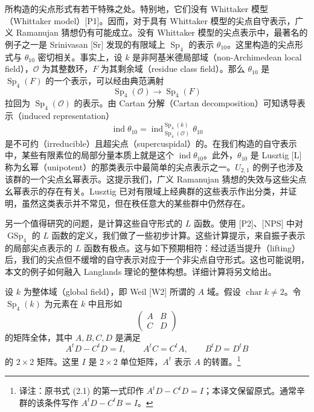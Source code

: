 所构造的尖点形式有若干特殊之处。特别地，它们没有 Whittaker 模型（Whittaker model）[P1]。因而，对于具有 Whittaker 模型的尖点自守表示，广义 Ramanujan 猜想仍有可能成立。没有 Whittaker 模型的尖点表示中，最著名的例子之一是 Srinivasan [Sr] 发现的有限域上 $\operatorname{Sp}_4$ 的表示 $\theta_{10}$。这里构造的尖点形式与 $\theta_{10}$ 密切相关。事实上，设 $k$ 是非阿基米德局部域（non-Archimedean local field），$\mathcal O$ 为其整数环，$F$ 为其剩余域（residue class field）。那么 $\theta_{10}$ 是 $\operatorname{Sp}_4(F)$ 的一个表示，可以经由典范满射
\[
\operatorname{Sp}_4(\mathcal O)\longrightarrow\operatorname{Sp}_4(F)
\]
拉回为 $\operatorname{Sp}_4(\mathcal O)$ 的表示。由 Cartan 分解（Cartan decomposition）可知诱导表示（induced representation）
\[
\operatorname{ind}\theta_{10}
 =\operatorname{ind}_{\operatorname{Sp}_4(\mathcal O)}^{\operatorname{Sp}_4(k)}\theta_{10}
\]
是不可约（irreducible）且超尖点（supercuspidal）的。在我们构造的自守表示中，某些有限素位的局部分量本质上就是这个 $\operatorname{ind}\theta_{10}$。此外，$\theta_{10}$ 是 Lusztig [L] 称为幺幂（unipotent）的那类表示中最简单的尖点表示之一。$U_{2,1}$ 的例子也涉及该群的一个尖点幺幂表示。这提示我们，广义 Ramanujan 猜想的失效与这些尖点幺幂表示的存在有关。Lusztig 已对有限域上经典群的这些表示作出分类，并证明，虽然这类表示并不常见，但在秩任意大的某些群中仍然存在。

另一个值得研究的问题，是计算这些自守形式的 $L$ 函数。使用 [P2]、[NPS] 中对 $\operatorname{GSp}_4$ 的 $L$ 函数的定义，我们做了一些初步计算。这些计算提示，来自振子表示的局部尖点表示的 $L$ 函数有极点。这与如下预期相符：经过适当提升（lifting）后，我们的尖点但不缓增的自守表示对应于一个非尖点自守形式。这也可能说明，本文的例子如何融入 Langlands 理论的整体构想。详细计算将另文给出。

设 $k$ 为整体域（global field），即 Weil [W2] 所谓的 $A$ 域。假设 $\operatorname{char}k\ne2$。令 $\operatorname{Sp}_4(k)$ 为元素在 $k$ 中且形如
\[
\begin{pmatrix}A&B\\C&D\end{pmatrix}
\]
的矩阵全体，其中 $A,B,C,D$ 是满足
\begin{equation}
 A^tD-C^tD=I,\qquad A^tC=C^tA,\qquad B^tD=D^tB
 \tag{2.1}
\end{equation}
的 $2\times2$ 矩阵。这里 $I$ 是 $2\times2$ 单位矩阵，$A^t$ 表示 $A$ 的转置。\footnote{译注：原书式 (2.1) 的第一式印作 $A^tD-C^tD=I$；本译文保留原式。通常辛群的该条件写作 $A^tD-C^tB=I$。}

